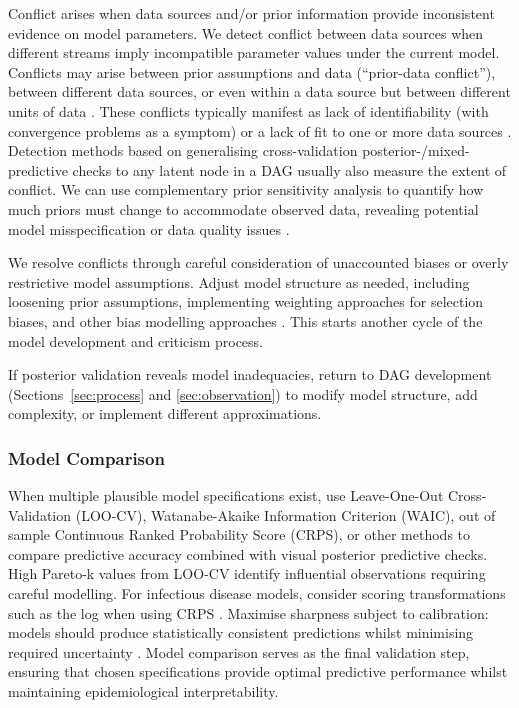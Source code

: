 \documentclass{article}
\begin{document}
Conflict arises when data sources and/or prior information provide inconsistent evidence on model parameters.
We detect conflict between data sources when different streams imply incompatible parameter values under the current model.
Conflicts may arise between prior assumptions and data (``prior-data conflict''), between different data sources, or even within a data source but between different units of data \citep{presanis2013conflict,yang2025detecting}.
These conflicts typically manifest as lack of identifiability (with convergence problems as a symptom) or a lack of fit to one or more data sources \citep{presanis2013conflict,deangelis2018analysing}. Detection methods based on generalising cross-validation posterior-/mixed-predictive checks to any latent node in a DAG \citep{presanis2013conflict,yang2025detecting} usually also measure the extent of conflict. We can use complementary  prior sensitivity analysis to quantify how much priors must change to accommodate observed data, revealing potential model misspecification or data quality issues \citep{Roos2015,Kallioinen2024,yang2025detecting}.

We resolve conflicts through careful consideration of unaccounted biases or overly restrictive model assumptions.
Adjust model structure as needed, including loosening prior assumptions, implementing weighting approaches for selection biases, and other bias modelling approaches \citep{deangelis2018analysing}.
This starts another cycle of the model development and criticism process.

If posterior validation reveals model inadequacies, return to DAG development (Sections~\ref{sec:process} and \ref{sec:observation}) to modify model structure, add complexity, or implement different approximations.

\subsubsection{Model Comparison}

When multiple plausible model specifications exist, use Leave-One-Out Cross-Validation (LOO-CV), Watanabe-Akaike Information Criterion (WAIC), out of sample Continuous Ranked Probability Score (CRPS), or other methods to compare predictive accuracy \citep{vehtari2017practical,yao2018using,gneiting2007strictly} combined with visual posterior predictive checks.
High Pareto-k values from LOO-CV identify influential observations requiring careful modelling.
For infectious disease models, consider scoring transformations such as the log when using CRPS \citep{bosse2023scoring}.
Maximise sharpness subject to calibration: models should produce statistically consistent predictions whilst minimising required uncertainty \citep{gneiting2007strictly}.
Model comparison serves as the final validation step, ensuring that chosen specifications provide optimal predictive performance whilst maintaining epidemiological interpretability.
\end{document}
